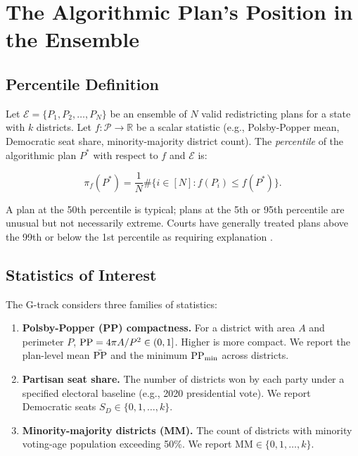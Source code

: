 \section{The Algorithmic Plan's Position in the Ensemble}
\label{sec:percentile}

\subsection{Percentile Definition}

Let $\mathcal{E} = \{P_1, P_2, \ldots, P_N\}$ be an ensemble of $N$ valid
redistricting plans for a state with $k$ districts.  Let $f: \mathcal{P} \to
\mathbb{R}$ be a scalar statistic (e.g., Polsby-Popper mean, Democratic seat
share, minority-majority district count).  The \emph{percentile} of the
algorithmic plan $P^*$ with respect to $f$ and $\mathcal{E}$ is:

\begin{equation}
  \pi_f(P^*) = \frac{1}{N} \#\{i \in [N] : f(P_i) \leq f(P^*)\}.
  \label{eq:percentile}
\end{equation}

A plan at the 50th percentile is typical; plans at the 5th or 95th percentile
are unusual but not necessarily extreme.  Courts have generally treated plans
above the 99th or below the 1st percentile as requiring explanation
\citep{herschlag2020quantifying}.

\subsection{Statistics of Interest}

The G-track considers three families of statistics:

\begin{enumerate}
  \item \textbf{Polsby-Popper (PP) compactness.}
    For a district with area $A$ and perimeter $P$,
    $\mathrm{PP} = 4\pi A / P^2 \in (0, 1]$.  Higher is more compact.
    We report the plan-level mean $\bar{\mathrm{PP}}$ and the minimum
    $\mathrm{PP}_{\min}$ across districts.

  \item \textbf{Partisan seat share.}
    The number of districts won by each party under a
    specified electoral baseline (e.g., 2020 presidential vote).
    We report Democratic seats $S_D \in \{0, 1, \ldots, k\}$.

  \item \textbf{Minority-majority districts (MM).}
    The count of districts with minority voting-age population exceeding
    50\%.  We report $\mathrm{MM} \in \{0, 1, \ldots, k\}$.
\end{enumerate}

